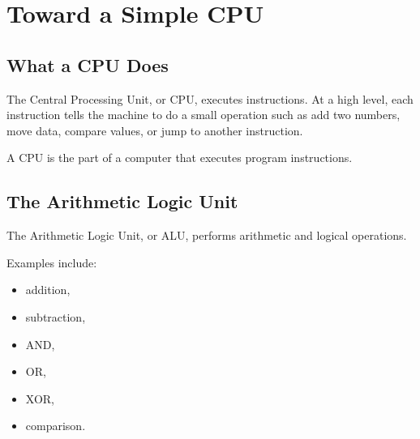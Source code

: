\chapter{Toward a Simple CPU}
\label{chap:toward-simple-cpu}



\section{What a CPU Does}

The Central Processing Unit, or CPU, executes instructions. At a high level, each instruction tells the machine to do a small operation such as add two numbers, move data, compare values, or jump to another instruction.

\begin{definition}
A CPU is the part of a computer that executes program instructions.
\end{definition}

\section{The Arithmetic Logic Unit}

The Arithmetic Logic Unit, or ALU, performs arithmetic and logical operations.

Examples include:

\begin{itemize}
    \item addition,
    \item subtraction,
    \item AND,
    \item OR,
    \item XOR,
    \item comparison.
\end{itemize}

